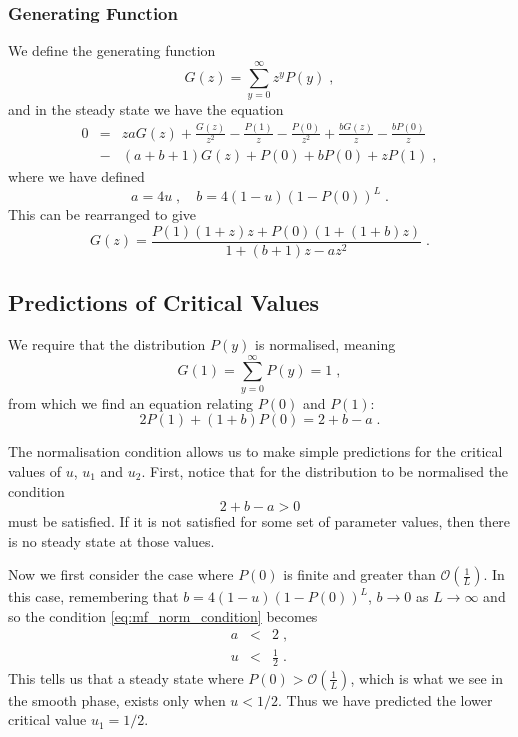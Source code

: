 \documentclass[a4paper,10pt]{article}
\newcommand{\Or}{\mathcal{O}}
\newcommand{\OL}{\Or\left(\frac{1}{L}\right)}
\newcommand{\pone}{P(1)}
\newcommand{\pzero}{P(0)}
\begin{document}
\subsubsection{Generating Function}

We define the generating function
\begin{equation}\label{eq:G_defn_P}
 G(z) = \sum_{y=0}^{\infty}z^yP(y) \;,
\end{equation}
and in the steady state we have the equation
\begin{eqnarray}
 0 & = & zaG(z) + \frac{G(z)}{z^2} - \frac{\pone}{z} - \frac{\pzero}{z^2} + \frac{bG(z)}{z} - \frac{b\pzero}{z} \nonumber \\
   & - & (a+b+1)G(z) + \pzero + b\pzero + z\pone \;,
\end{eqnarray}
where we have defined
\begin{equation}
  a = 4u \;, \quad b = 4(1-u)(1-P(0))^L \;.
\end{equation}
This can be rearranged to give
\begin{equation}\label{eq:Gz_solve}
  G(z) = \frac{\pone(1+z)z + \pzero(1+(1+b)z)}{1 + (b+1)z -az^2} \;.
\end{equation}


\subsection{Predictions of Critical Values}

We require that the distribution $P(y)$ is normalised, meaning
\begin{equation}
  G(1) = \sum_{y=0}^\infty P(y) = 1 \;,
\end{equation}
from which we find an equation relating $P(0)$ and $P(1)$:
\begin{equation}\label{eq:normalisation}
  2\pone + (1+b) \pzero = 2 + b - a \;.
\end{equation}

The normalisation condition allows us to make simple predictions for the critical values of $u$, $u_1$ and $u_2$. First, notice that for the distribution to be normalised the condition
\begin{equation}\label{eq:mf_norm_condition}
  2 + b - a > 0
\end{equation}
must be satisfied. If it is not satisfied for some set of parameter values, then there is no steady state at those values. 

Now we first consider the case where $P(0)$ is finite and greater than $\OL$. In this case, remembering that $b = 4(1-u)(1-P(0))^L$, $b\to0$ as $L\to\infty$ and so the condition \eqref{eq:mf_norm_condition} becomes
\begin{eqnarray}
  a & < & 2  \;, \nonumber \\
  u & < & \frac{1}{2} \;.
\end{eqnarray}
This tells us that a steady state where $P(0) > \OL$, which is what we see in the smooth phase, exists only when $u < 1/2$. Thus we have predicted the lower critical value $u_1 = 1/2$.
\end{document}
